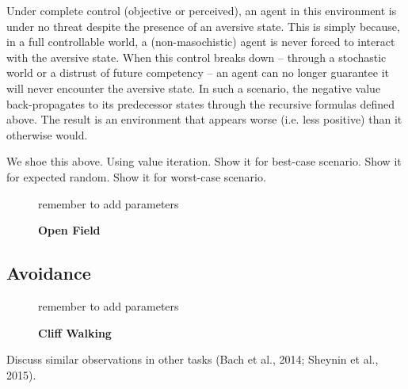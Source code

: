 \documentclass[11pt]{article} %
\begin{document}
Under complete control (objective or perceived), an agent in this environment is
under no threat despite the presence of an aversive state. This is simply because,
in a full controllable world, a (non-masochistic) agent is never forced to interact
with the aversive state. When this control breaks down -- through a stochastic
world or a distrust of future competency -- an agent can no longer guarantee it
will never encounter the aversive state. In such a scenario, the negative value
back-propagates to its predecessor states through the recursive formulas defined
above. The result is an environment that appears worse (i.e. less positive) than
it otherwise would.

We shoe this above. Using value iteration. Show it for best-case scenario. Show
it for expected random. Show it for worst-case scenario.

\begin{figure}
  \centerline{%
  }
  \caption{\textbf{Open Field}}
  \par remember to add parameters
\end{figure}

\subsection{Avoidance}

\begin{figure}
  \centerline{%
  }
  \caption{\textbf{Cliff Walking}}
  \par remember to add parameters
\end{figure}

Discuss similar observations in other tasks (Bach et al., 2014; Sheynin et al., 2015).
\end{document}
